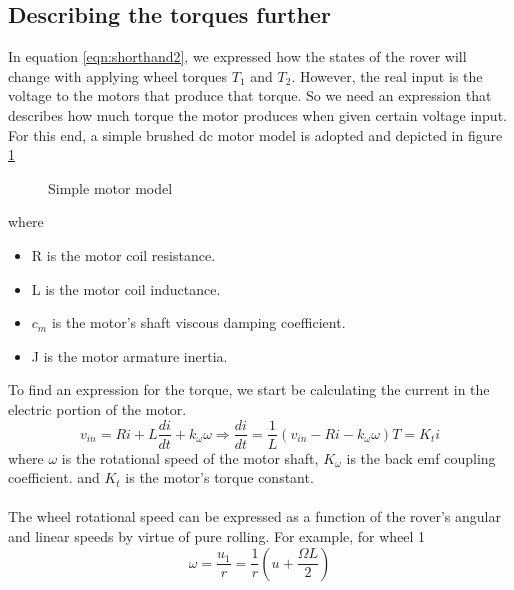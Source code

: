 \documentclass{article}
\begin{document}
	 \subsection{Describing the torques further}
	 In equation \ref{eqn:shorthand2}, we expressed how the states of the rover will change with applying wheel torques $T_1$ and $T_2$. However, the real input is the voltage to the motors that produce that torque. So we need an expression that describes how much torque the motor produces when given certain voltage input. For this end, a simple brushed dc motor model is adopted and depicted in figure \ref{fig:motor}
	 \begin{figure}[H]
	 	\centering
	 	\def\svgwidth{350pt}
	 	
	 	\caption{Simple motor model}
	 	\label{fig:motor}
	 \end{figure}
	 where
	 \begin{itemize}
	 	\item R is the motor coil resistance.
	 	\item L is the motor coil inductance.
	 	\item $c_m$ is the motor's shaft viscous damping coefficient.
	 	\item J is the motor armature inertia.
	 \end{itemize}
	 To find an expression for the torque, we start be calculating the current in the electric portion of the motor. 
	 \begin{subequations}
	 	\begin{equation}
	 v_{in} = Ri + L\frac{di}{dt}+k_{\omega}\omega\Rightarrow \frac{di}{dt} = \frac{1}{L}\left(v_{in}-Ri-k_{\omega}\omega\right)
	 \end{equation}
	 \begin{equation}
	 T = K_t i
	 \end{equation}
	 \end{subequations}
	 where $\omega$ is the rotational speed of the motor shaft, $K_{\omega}$ is the back emf coupling coefficient. and $K_t$ is the motor's torque constant. 
	 
	 \paragraph{}The wheel rotational speed can be expressed as a function of the rover's angular and linear speeds by virtue of pure rolling. For example, for wheel 1  
	 \begin{equation}
	 \omega = \frac{u_1}{r} = \frac{1}{r}\left(u+\frac{\Omega L}{2}\right)
	 \end{equation}
	 
\end{document}
